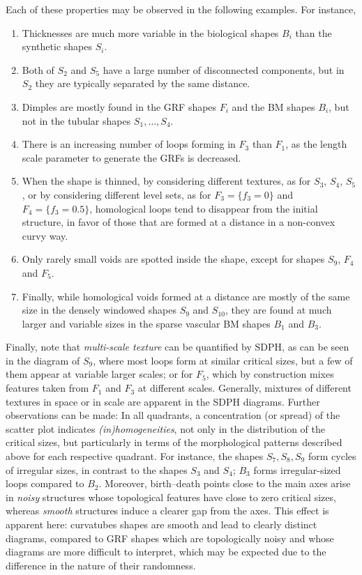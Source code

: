 \documentclass[11pt]{article}
\theoremstyle{plain}
\theoremstyle{definition}
\theoremstyle{remark}
\begin{document}
	Each of these properties may be observed in the following examples. For instance, 
	\begin{enumerate}
		\item Thicknesses are much more variable in the biological shapes $B_i$ than the synthetic shapes $S_i$. 
		\item Both of $S_2$ and $S_5$ have a large number of disconnected components, but in $S_2$ they are typically separated by the same distance. 
		\item Dimples are mostly found in the GRF shapes $F_i$ and the BM shapes $B_i$, but not in the tubular shapes $S_1, \ldots, S_4$.
		\item There is an increasing number of loops forming in $F_3$ than $F_1$, as the length scale parameter to generate the GRFs is decreased.
		\item When the shape is thinned, by considering different textures, as for $S_3$, $S_4$, $S_5$, or by considering different level sets, as for $F_3 = \{f_3 = 0\}$ and $F_4 = \{f_3 = 0.5\}$, homological loops tend to disappear from the initial structure, in favor of those that are formed at a distance in a non-convex curvy way.
		\item Only rarely small voids are spotted inside the shape, except for shapes $S_9$, $F_4$ and $F_5$. 
		\item Finally, while homological voids formed at a distance are mostly of the same size in the densely windowed shapes $S_9$ and $S_{10}$, they are found at much larger and variable sizes in the sparse vascular BM shapes $B_1$ and $B_3$.
	\end{enumerate}
	
	
	Finally, note that \textit{multi-scale texture} can be quantified by SDPH, as can be seen in the diagram of $S_9$, where most loops form at similar critical sizes, but a few of them appear at variable larger scales; or for $F_5$, which by construction mixes features taken from $F_1$ and $F_3$ at different scales. Generally, mixtures of different textures in space or in scale are apparent in the SDPH diagrams.
	Further observations can be made: In all quadrants, a concentration (or spread) of the scatter plot indicates \textit{(in)homogeneities}, not only in the distribution of the critical sizes, but particularly in terms of the morphological patterns described above for each respective quadrant. For instance, the shapes $S_7, S_8, S_9$ form cycles of irregular sizes, in contrast to the shapes $S_3$ and $S_4$; $B_3$ forms irregular-sized loops compared to $B_2$. Moreover, birth--death points close to the main axes arise in \textit{noisy} structures whose topological features have close to zero critical sizes, whereas \textit{smooth} structures induce a clearer gap from the axes. This effect is apparent here: curvatubes shapes are smooth and lead to clearly distinct diagrams, compared to GRF shapes which are topologically noisy and whose diagrams are more difficult to interpret, which may be expected due to the difference in the nature of their randomness.
	
\end{document}
